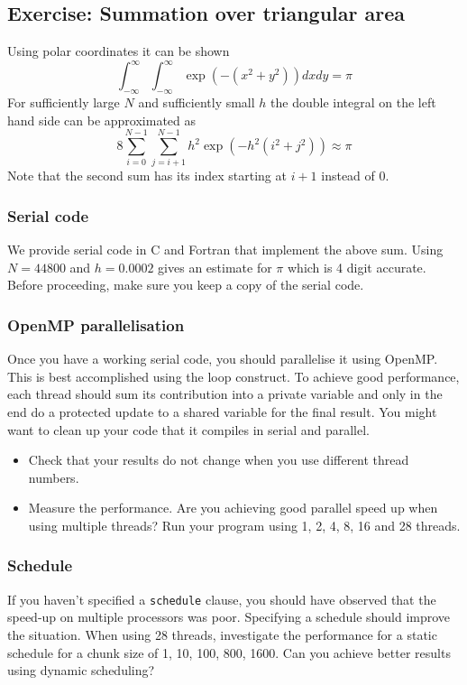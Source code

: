 \subsection{Exercise: Summation over triangular area}\label{triangularSumExercise}

Using polar coordinates it can be shown
\begin{equation}
\int_{-\infty}^\infty \int_{-\infty}^\infty \exp(-(x^2 +y^2)) dx dy = \pi
\end{equation}
For sufficiently large $N$ and sufficiently small $h$ the double integral on the left hand side can be approximated as
\begin{equation}
8\sum_{i=0}^{N-1}\sum_{j=i+1}^{N-1}
h^2 \exp\left(-h^2 (i^2 + j^2)
\right) \approx \pi
\end{equation}
Note that the second sum has its index starting at $i+1$ instead of 0.

\subsubsection{Serial code}\label{triangularSumExercise_serial}
We provide serial code in C and Fortran that implement the above sum.
Using $N=44800$ and $h=0.0002$ gives an estimate for $\pi$ which is 4 digit accurate.  Before proceeding, make sure you keep a copy of the serial code.

\subsubsection{OpenMP parallelisation}
Once you have a working serial code, you should parallelise it using OpenMP.   This is best accomplished using the loop construct.  To achieve good performance, each thread should sum its contribution into a private variable and only in the end do a protected update to a shared variable for the final result. You might want to clean up your code that it compiles in serial and parallel.
\begin{itemize}
\item Check that your results do not change when you use different thread numbers.
\item Measure the performance.  Are you achieving good parallel speed up when using multiple threads?  Run your program using 1, 2, 4, 8, 16 and 28 threads.
\end{itemize}

\subsubsection{Schedule}
If you haven't specified a \verb+schedule+ clause, you should have observed that the speed-up on multiple processors was poor.  Specifying a schedule should improve the situation.  When using 28 threads, investigate the performance for a static schedule for a chunk size of 1, 10, 100, 800, 1600.  Can you achieve better results using dynamic scheduling?

